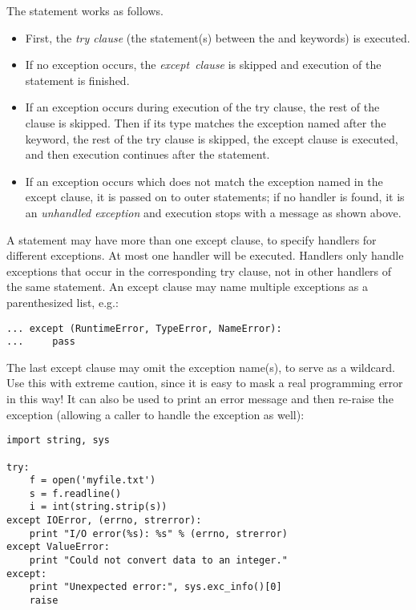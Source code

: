 \documentclass{manual}
\begin{document}
The  statement works as follows.

\begin{itemize}
\item
First, the \emph{try clause} (the statement(s) between the
 and  keywords) is executed.

\item
If no exception occurs, the \emph{except\ clause} is skipped and
execution of the  statement is finished.

\item
If an exception occurs during execution of the try clause, the rest of
the clause is skipped.  Then if its type matches the exception named
after the  keyword, the rest of the try clause is
skipped, the except clause is executed, and then execution continues
after the  statement.

\item
If an exception occurs which does not match the exception named in the
except clause, it is passed on to outer  statements; if
no handler is found, it is an \emph{unhandled exception} and execution
stops with a message as shown above.

\end{itemize}

A  statement may have more than one except clause, to
specify handlers for different exceptions.  At most one handler will
be executed.  Handlers only handle exceptions that occur in the
corresponding try clause, not in other handlers of the same
 statement. An except clause may name multiple exceptions
as a parenthesized list, e.g.:

\begin{verbatim}
... except (RuntimeError, TypeError, NameError):
...     pass
\end{verbatim}

The last except clause may omit the exception name(s), to serve as a
wildcard.  Use this with extreme caution, since it is easy to mask a
real programming error in this way!  It can also be used to print an
error message and then re-raise the exception (allowing a caller to
handle the exception as well):

\begin{verbatim}
import string, sys

try:
    f = open('myfile.txt')
    s = f.readline()
    i = int(string.strip(s))
except IOError, (errno, strerror):
    print "I/O error(%s): %s" % (errno, strerror)
except ValueError:
    print "Could not convert data to an integer."
except:
    print "Unexpected error:", sys.exc_info()[0]
    raise
\end{verbatim}
\end{document}

